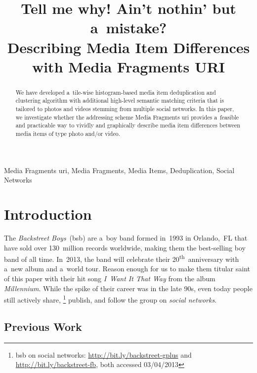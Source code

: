 \documentclass{article}
\begin{document}
\sloppy

\newcommand{\ts}{\textsuperscript}

\title{Tell me why! Ain't nothin' but a~mistake?\\ Describing Media Item Differences with Media Fragments URI}
%
\address{}

\maketitle

%
\begin{abstract}
We have developed a~tile-wise histogram-based
media item deduplication and clustering algorithm
with additional high-level semantic matching criteria
that is tailored to photos and videos stemming from multiple social networks.
In this paper, we investigate whether the addressing scheme
Media Fragments  {\sc uri} provides a~feasible and practicable way
to vividly and graphically describe media item differences
between media items of type photo and/or video.
\end{abstract}
%
\begin{keywords}
Media Fragments {\sc uri}, Media Fragments, Media Items, Deduplication, Social Networks
\end{keywords}
%
\section{Introduction}
\label{sec:introduction}

The \emph{Backstreet Boys}~({\sc bsb}) are a~boy band
formed in~1993 in Orlando,~FL
that have sold over 130~million records worldwide,
making them the best-selling boy band of all time.
In~2013, the band will celebrate their 20\ts{th}~anniversary
with a~new album and a~world tour.
Reason enough for us to make them titular saint of this paper
with their hit song \emph{I~Want It That Way}
from the album \emph{Millennium}.
While the spike of their career was in the late 90s,
even today people still actively share,%
\footnote{{\sc bsb} on social networks: \url{http://bit.ly/backstreet-gplus}
and \url{http://bit.ly/backstreet-fb},
both accessed 03/04/2013}
publish, and follow the group on \emph{social networks}.

\subsection{Previous Work}
\label{sec:previous-work}
\end{document}
